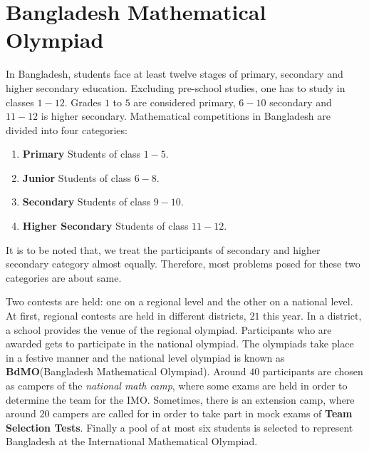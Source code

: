 \documentclass{subfile}
\begin{document}
	\section*{Bangladesh Mathematical Olympiad}
	In Bangladesh, students face at least twelve stages of primary, secondary and higher secondary education. Excluding pre-school studies, one has to study in classes $1-12$. Grades $1$ to $5$ are considered primary, $6-10$ secondary and $11-12$ is higher secondary. Mathematical competitions in Bangladesh are divided into four categories:
	\begin{enumerate}
		\item \textbf{Primary} Students of class $1-5$.
		\item \textbf{Junior} Students of class $6-8$.
		\item \textbf{Secondary} Students of class $9-10$.
		\item \textbf{Higher Secondary} Students of class $11-12$.
	\end{enumerate}
	It is to be noted that, we treat the participants of secondary and higher secondary category almost equally. Therefore, most problems posed for these two categories are about same.
	
	Two contests are held: one on a regional level and the other on a national level. At first, regional contests are held in different districts, $21$ this year. In a district, a school provides the venue of the regional olympiad. Participants who are awarded gets to participate in the national olympiad. The olympiads take place in a festive manner and the national level olympiad is known as \textbf{BdMO}(Bangladesh Mathematical Olympiad). Around $40$ participants are chosen as campers of the \textit{national math camp}, where some exams are held in order to determine the team for the IMO. Sometimes, there is an extension camp, where around $20$ campers are called for in order to take part in mock exams of \textbf{Team Selection Tests}. Finally a pool of at most six students is selected to represent Bangladesh at the International Mathematical Olympiad.\newpage
	
\end{document}
